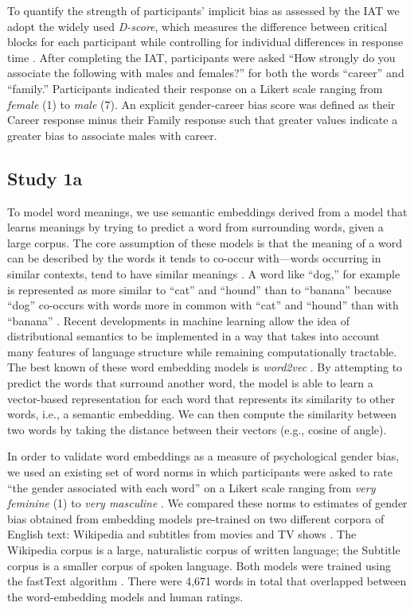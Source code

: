 \documentclass[9pt,twocolumn,twoside]{pnas-new}
\begin{document}
{To quantify the strength of participants’ implicit bias as assessed by the IAT we adopt the widely used  \emph{D-score}, which measures the difference between critical blocks for each participant while controlling for individual differences
in response time \cite{greenwald1998measuring}. After completing
the IAT, participants were asked \enquote{How strongly do you associate
the following with males and females?} for both the words
\enquote{career} and \enquote{family.} Participants indicated their
response on a Likert scale ranging from \emph{female} (1) to \emph{male}
(7). An explicit gender-career bias score was defined as their Career response minus their Family response such that greater values indicate a greater bias to associate males with career.


\subsection*{Study 1a}

To model word meanings, we use semantic embeddings derived from a model
that learns meanings by trying to predict a word from surrounding words,
given a large corpus. The core assumption of these models is that the
meaning of a word can be described by the words it tends to co-occur
with---words occurring in similar contexts, tend to have similar
meanings \cite{firth1957synopsis}. A word like \enquote{dog,} for example is
represented as more similar to \enquote{cat} and \enquote{hound} than to
\enquote{banana} because \enquote{dog} co-occurs with words more in
common with \enquote{cat} and \enquote{hound} than with \enquote{banana} \cite{landauer1997solution,lund1996producing}. Recent developments
in machine learning allow the idea of distributional semantics to be
implemented in a way that takes into account many features of language
structure while remaining computationally tractable. The best known of
these word embedding models is \emph{word2vec} \cite{mikolov2013efficient}. By attempting to predict the words that surround another
word, the model is able to learn a vector-based representation for each
word that represents its similarity to other words, i.e., a semantic
embedding. We can then compute the similarity between two words by
taking the distance between their vectors (e.g., cosine of angle).

In order to validate word embeddings as a measure of psychological
gender bias, we used an existing set of word norms in which participants
were asked to rate \enquote{the gender associated with each word} on a
Likert scale ranging from \emph{very feminine} (1) to \emph{very
masculine} \cite[7]{scott2018glasgow}. We
compared these norms to estimates of gender bias obtained from embedding
models pre-trained on two different corpora of English text: Wikipedia
\cite{bojanowski2016enriching} and subtitles from movies
and TV shows \cite{vanparidon,lison}. The Wikipedia corpus is a large, naturalistic corpus of written
language; the Subtitle corpus is a smaller corpus of spoken language.
Both models were trained using the fastText algorithm \cite[a variant of
word2vec]{joulin2016bag}. There were 4,671
words in total that overlapped between the word-embedding models and
human ratings.

}
\end{document}
